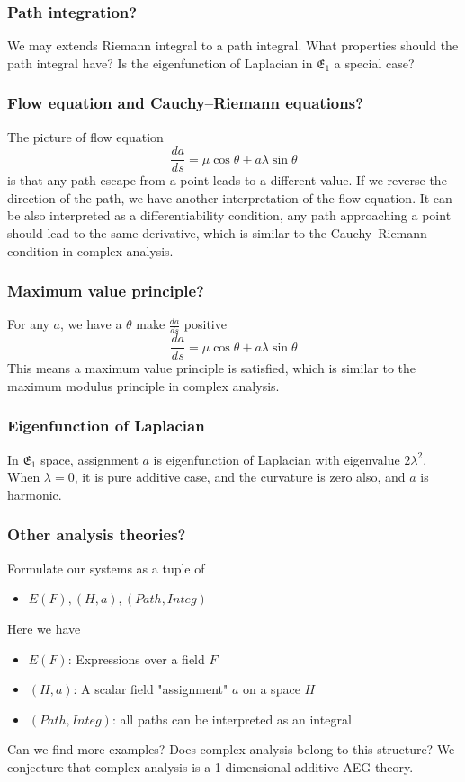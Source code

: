 \documentclass[aspectratio=169]{beamer}
\begin{document}
\begin{frame}
    \frametitle{Path integration?}
    We may extends Riemann integral to a path integral.
    What properties should the path integral have? Is the eigenfunction of Laplacian in $\mathfrak{E}_1$ a special case?
\end{frame}

\begin{frame}
    \frametitle{Flow equation and Cauchy–Riemann equations?}
    The picture of flow equation
    \[
        \frac{da}{ds} = \mu \cos \theta + a \lambda \sin \theta
    \]
    is that any path escape from a point leads to a different value.
    If we reverse the direction of the path, we have another interpretation of the flow equation.
    It can be also interpreted as a differentiability condition, any path approaching a point should lead to the same
    derivative, which is similar to the Cauchy–Riemann condition in complex analysis.
\end{frame}

\begin{frame}
    \frametitle{Maximum value principle?}
    For any $a$, we have a $\theta$ make $\frac{da}{ds}$ positive
    \[
        \frac{da}{ds} = \mu \cos \theta + a \lambda \sin \theta
    \]
    This means a maximum value principle is satisfied,
    which is similar to the maximum modulus principle in complex analysis.
\end{frame}

\begin{frame}
    \frametitle{Eigenfunction of Laplacian}
    In $\mathfrak{E_1}$ space, assignment $a$ is eigenfunction of Laplacian with eigenvalue $2 \lambda^2$.
    When $\lambda = 0$, it is pure additive case, and the curvature is zero also, and $a$ is harmonic.
\end{frame}

\begin{frame}
    \frametitle{Other analysis theories?}
    Formulate our systems as a tuple of
    \begin{itemize}
        \item $E(F), (H, a), (Path, Integ)$
    \end{itemize}
    Here we have
    \begin{itemize}
        \item $E(F)$: Expressions over a field $F$
        \item $(H, a)$: A scalar field "assignment" $a$ on a space $H$
        \item $(Path, Integ)$: all paths can be interpreted as an integral
    \end{itemize}
    Can we find more examples? Does complex analysis belong to this structure?
    We conjecture that complex analysis is a 1-dimensional additive AEG theory.
\end{frame}
\end{document}

